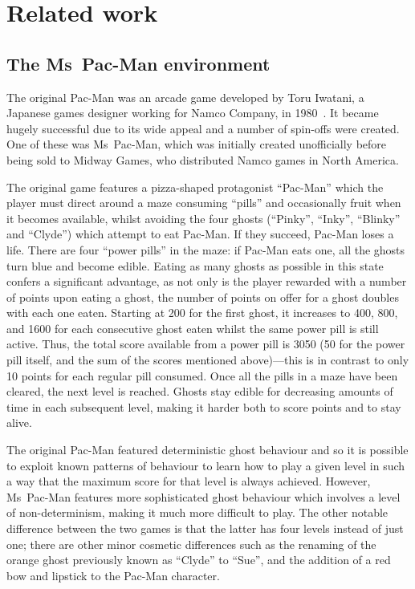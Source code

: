 \chapter{Related work}
\label{ch:related}


\section{The Ms~Pac-Man environment}
The original Pac-Man was an arcade game developed by Toru Iwatani, a Japanese games designer working for Namco Company, in 1980~\citep{Samothrakis2011}.  It became hugely successful due to its wide appeal and a number of spin-offs were created.  One of these was Ms~Pac-Man, which was initially created unofficially before being sold to Midway Games, who distributed Namco games in North America.

The original game features a pizza-shaped protagonist ``Pac-Man'' which the player must direct around a maze consuming ``pills'' and occasionally fruit when it becomes available, whilst avoiding the four ghosts (``Pinky'', ``Inky'', ``Blinky'' and ``Clyde'') which attempt to eat Pac-Man.  If they succeed, Pac-Man loses a life.  There are four ``power pills'' in the maze: if Pac-Man eats one, all the ghosts turn blue and become edible.  Eating as many ghosts as possible in this state confers a significant advantage, as not only is the player rewarded with a number of points upon eating a ghost, the number of points on offer for a ghost doubles with each one eaten.  Starting at 200 for the first ghost, it increases to 400, 800, and 1600 for each consecutive ghost eaten whilst the same power pill is still active.  Thus, the total score available from a power pill is 3050 (50 for the power pill itself, and the sum of the scores mentioned above)---this is in contrast to only 10 points for each regular pill consumed.  Once all the pills in a maze have been cleared, the next level is reached.  Ghosts stay edible for decreasing amounts of time in each subsequent level, making it harder both to score points and to stay alive.

The original Pac-Man featured deterministic ghost behaviour and so it is possible to exploit known patterns of behaviour to learn how to play a given level in such a way that the maximum score for that level is always achieved.  However, Ms~Pac-Man features more sophisticated ghost behaviour which involves a level of non-determinism, making it much more difficult to play.  The other notable difference between the two games is that the latter has four levels instead of just one; there are other minor cosmetic differences such as the renaming of the orange ghost previously known as ``Clyde'' to ``Sue'', and the addition of a red bow and lipstick to the Pac-Man character.

